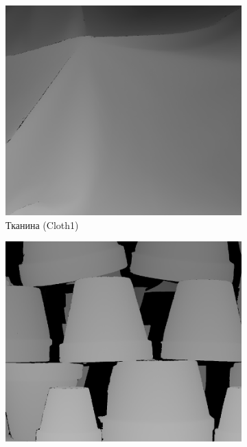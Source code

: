\begin{figure}[h]
\centering
    \begin{subfigure}[t]{0.32\textwidth}
        \centering
        \includegraphics[width=\textwidth]{images/cloth_ground_truth}
        \caption{Тканина (Cloth1)}
        \label{fig:cloth:ground:truth}
    \end{subfigure}
    \hfill
    \begin{subfigure}[t]{0.32\textwidth}
        \centering
        \includegraphics[width=\textwidth]{images/pots_ground_truth}

\end{subfigure}
\end{figure}
